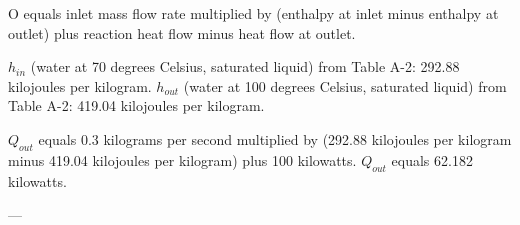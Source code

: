 O equals inlet mass flow rate multiplied by (enthalpy at inlet minus enthalpy at outlet) plus reaction heat flow minus heat flow at outlet.  

\( h_{in} \) (water at 70 degrees Celsius, saturated liquid) from Table A-2: 292.88 kilojoules per kilogram.  
\( h_{out} \) (water at 100 degrees Celsius, saturated liquid) from Table A-2: 419.04 kilojoules per kilogram.  

\( Q_{out} \) equals 0.3 kilograms per second multiplied by (292.88 kilojoules per kilogram minus 419.04 kilojoules per kilogram) plus 100 kilowatts.  
\( Q_{out} \) equals 62.182 kilowatts.  

---